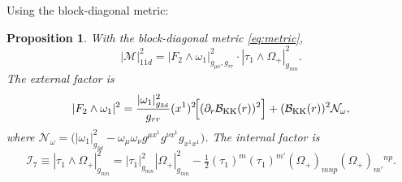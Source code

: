 \documentclass[a4paper,11pt,fleqn]{article}
\theoremstyle{plain}
\newtheorem{proposition}[theorem]{Proposition}
\theoremstyle{definition}
\newcommand{\Om}{\Omega}
\newcommand{\ta}{\tau}
\newcommand{\Nf}{{\cal B}_{\rm KK}(r)}
\newcommand{\gthree}{g_{3d}}
\newcommand{\grr}{g_{rr}}
\newcommand{\Ical}{\mathcal{I}_7}
\begin{document}
Using the block-diagonal metric:
\begin{proposition}
\label{prop:normfact}
With the block-diagonal metric \eqref{eq:metric},
\begin{equation}
|\mathcal{M}|^2_{11d}
= |F_2\wedge\omega_1|^2_{g_{\mu\nu},\grr}
\cdot
|\ta_1\wedge\Om_+|^2_{g_{mn}}.
\label{eq:normfact}
\end{equation}
The external factor is
\begin{equation}
|F_2\wedge\omega_1|^2
=
\frac{|\omega_1|^2_{\gthree}}{\grr}(x^1)^2
\!\Bigl[(\partial_r\Nf)^2\Bigr]
+ (\Nf)^2\mathcal{N}_\omega,
\label{eq:extnorm}
\end{equation}
where $\mathcal{N}_\omega = \bigl(|\omega_1|^2_{\gthree}
-\omega_\mu\omega_\nu g^{\mu x^1}g^{\nu x^1}g_{x^1x^1}\bigr)$.
The internal factor is
\begin{equation}
\Ical \equiv |\ta_1\wedge\Om_+|^2_{g_{mn}}
= |\ta_1|^2_{g_{mn}}|\Om_+|^2_{g_{mn}}
- \tfrac{1}{2}(\ta_1)^m(\ta_1)^{m'}(\Om_+)_{mnp}(\Om_+)_{m'}{}^{np}.
\label{eq:I7def}
\end{equation}
\end{proposition}
\end{document}
